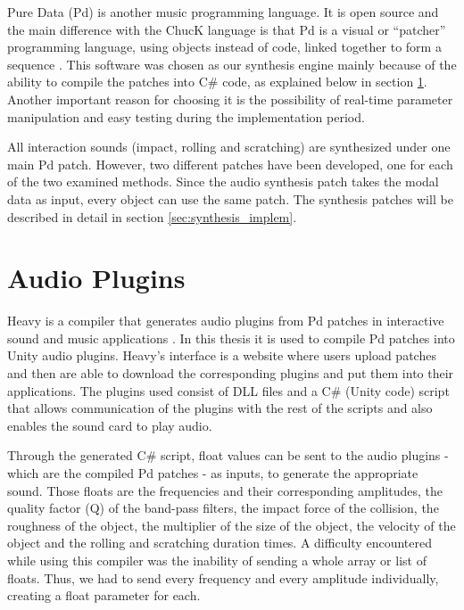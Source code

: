 Pure Data (\gls{Pd}) is another music programming language. It is open source and the main difference with the ChucK language is that \gls{Pd} is a visual or ``patcher'' programming language, using objects instead of code, linked together to form a sequence \cite{bib:pd}. This software was chosen as our synthesis engine mainly because of the ability to compile the patches into C\# code, as explained below in section \ref{sec:heavy}. Another important reason for choosing it is the possibility of real-time parameter manipulation and easy testing during the implementation period.

All interaction sounds (impact, rolling and scratching) are synthesized under one main \gls{Pd} patch. However, two different patches have been developed, one for each of the two examined methods. Since the audio synthesis patch takes the modal data as input, every object can use the same patch. The synthesis patches will be described in detail in section \ref{sec:synthesis_implem}.


\section{Audio Plugins}\label{sec:heavy}

Heavy is a compiler that generates audio plugins from \gls{Pd} patches in interactive sound and music applications \cite{bib:heavy}. In this thesis it is used to compile \gls{Pd} patches into Unity\textsuperscript{\textregistered} audio plugins. Heavy's interface is a website where users upload patches and then are able to download the corresponding plugins and put them into their applications. The plugins used consist of \gls{DLL} files and a C\# (Unity\textsuperscript{\textregistered} code) script that allows communication of the plugins with the rest of the scripts and also enables the sound card to play audio.

Through the generated C\# script, float values can be sent to the audio plugins - which are the compiled \gls{Pd} patches - as inputs, to generate the appropriate sound. Those floats are the frequencies and their corresponding amplitudes, the quality factor (\gls{Q}) of the band-pass filters, the impact force of the collision, the roughness of the object, the multiplier of the size of the object, the velocity of the object and the rolling and scratching duration times. A difficulty encountered while using this compiler was the inability of sending a whole array or list of floats. Thus, we had to send every frequency and every amplitude individually, creating a float parameter for each.
 

